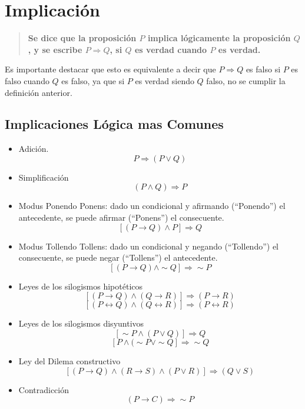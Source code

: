 \documentclass[a4paper,11pt,oneside,titlepage,final]{scrartc}
\begin{document}
\newpage
\section{Implicación}

\begin{quote}
\textbf{Se dice que la proposición $P$ implica lógicamente la proposición $Q$, y se escribe $P \Longrightarrow Q$, si $Q$ es verdad cuando $P$ es verdad.}
\end{quote}

Es importante destacar que esto es equivalente a decir que $P \Longrightarrow Q$ es falso si $P$ es falso cuando $Q$ es falso, ya que si $P$ es verdad siendo $Q$ falso, no se cumplir la definición anterior.\\

\subsection{Implicaciones Lógica mas Comunes}

\begin{itemize}
\item Adición.
$$P \Longrightarrow (P \vee Q)$$
\item Simplificación
$$(P \wedge Q) \Longrightarrow P$$
\item Modus Ponendo Ponens: dado un condicional y afirmando (“Ponendo”) el antecedente, se puede afirmar (“Ponens”) el consecuente.
$$[(P \longrightarrow Q) \wedge P] \Longrightarrow Q$$
\item Modus Tollendo Tollens: dado un condicional y negando (“Tollendo”) el consecuente, se puede negar (“Tollens”) el antecedente.
$$[(P \longrightarrow Q) \wedge \sim Q] \Longrightarrow \sim P$$
\item Leyes de los silogismos hipotéticos
$$[(P \longrightarrow Q) \wedge (Q \longrightarrow R)] \Longrightarrow (P \longrightarrow R)$$
$$[(P \longleftrightarrow Q) \wedge (Q \longleftrightarrow R)] \Longrightarrow (P \longleftrightarrow R)$$
\item Leyes de los silogismos disyuntivos
$$[\sim P \wedge (P \vee Q)] \Longrightarrow Q$$
$$[P \wedge (\sim P \vee \sim Q] \Longrightarrow \sim Q$$
\item Ley del Dilema constructivo
$$[(P \longrightarrow Q) \wedge (R \longrightarrow S) \wedge (P \vee R)] \Longrightarrow (Q \vee S)$$
\item Contradicción
$$(P \longrightarrow C) \Longrightarrow \sim P$$
\end{itemize}
\end{document}
